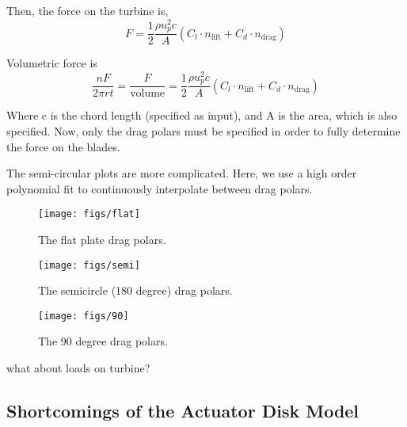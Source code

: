 Then, the force on the turbine is, 
\begin{equation}
 \boxed{F = \frac{1}{2}\frac{\rho u_p^2 c}{A}\left(C_l \cdot
					      n_\text{lift} + C_d \cdot n_\text{drag}  \right)}
\end{equation}

Volumetric force is
\begin{equation}
 \boxed{\frac{n F}{2 \pi r t} = \frac{F}{\text{volume}}= \frac{1}{2}\frac{\rho u_p^2 c}{A}\left(C_l \cdot
					      n_\text{lift} + C_d \cdot n_\text{drag}  \right)}
\end{equation}


Where c is the chord length (specified as input), and A is the area,
which is also specified. Now, only the drag polars must be specified in
order to fully determine the force on the blades.

The semi-circular plots are more complicated. Here, we use a high order
polynomial fit to continuously interpolate between drag polars. 

\begin{figure}[!htb]
  \begin{center}
    \texttt{[image: figs/flat]}
    \caption{The flat plate drag polars.} 
    \label{fig:flat_plate_drag}
  \end{center}
\end{figure}

\begin{figure}[!htb]
  \begin{center}
    \texttt{[image: figs/semi]}
    \caption{The semicircle (180 degree) drag polars.} 
    \label{fig:semi_drag}
  \end{center}
\end{figure}

\begin{figure}[!htb]
  \begin{center}
    \texttt{[image: figs/90]}
    \caption{The 90 degree drag polars.} 
    \label{fig:90_drag}
  \end{center}
\end{figure}

what about loads on turbine?

\subsection{Shortcomings of the Actuator Disk Model}
\label{subsec:wake_loss_model}

